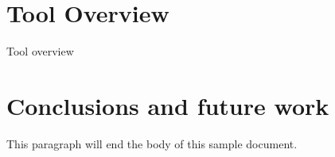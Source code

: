 \documentclass{acm_proc_article-sp}
\begin{document}
\section{Tool Overview}
Tool overview


\section{Conclusions and future work}
This paragraph will end the body of this sample document.





%


\end{document}
